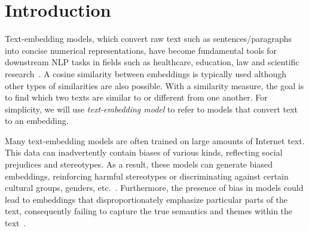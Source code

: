 \section{Introduction}
Text-embedding models, which convert raw text such as sentences/paragraphs into concise numerical representations, have become fundamental tools for downstream NLP tasks in fields such as healthcare, education, law and scientific research~\citep{chrysostomou2022flexible, reimers2019sentence, tenney2019bert, nie2024text, sun2019bert4rec}.
A cosine similarity between embeddings is typically used \cite{zhang2019bertscore, mathur2019putting} although other types of similarities  \cite{steck2024cosine} are also possible. With a similarity measure, the goal is to find which two texts are similar to or different from one another.  For simplicity, we will use \textit{text-embedding model} to refer to models that convert text to an embedding.



Many text-embedding models are often trained on large amounts of Internet text. This data can inadvertently contain biases of various kinds, reflecting social prejudices and stereotypes. As a result, these models can generate biased embeddings, reinforcing harmful stereotypes or discriminating against certain cultural groups, genders, etc.~\citep{gallegos2024bias, li2023survey, rakivnenko2024bias}. Furthermore, the presence of bias in models could lead to embeddings that disproportionately emphasize particular parts of the text, consequently failing to capture the true semantics and themes within the text~\citep{rakivnenko2024bias}.

 


